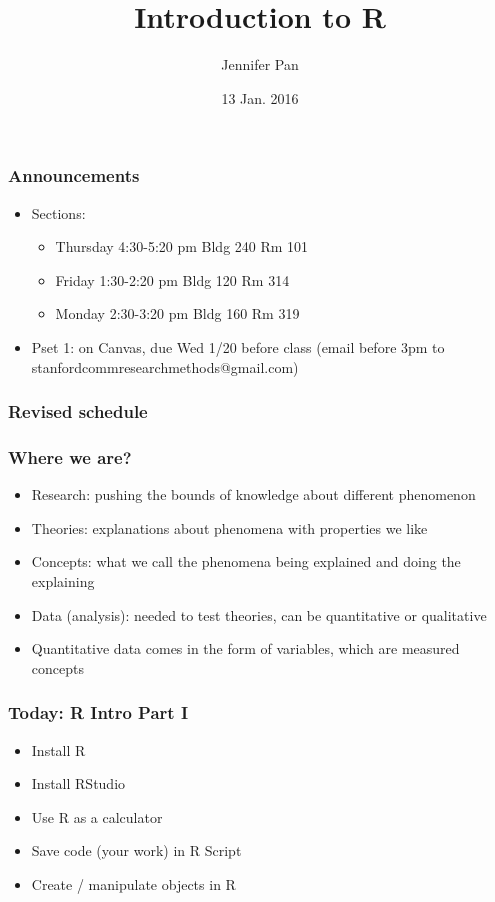 \documentclass{beamer}
\title[COMM 106/206]{Introduction to R}
\subtitle{\black{Communication Research Methods}} %
\author[Jennifer Pan]{Jennifer Pan}
\institute[Stanford]{Assistant Professor\\
  Department of Communication\\
  Stanford University
  \mbox{ }\\
  \mbox{ }\\
  \mbox{ }\\
  \mbox{ }\\
  \mbox{ }\\
  \mbox{ }\\
  \mbox{ }\\
  \mbox{ }\\
  \mbox{ }\\
  {January 13, 2016}}
\date{}
\begin{document}
\frame{\titlepage}
\date{13 Jan. 2016}

\begin{frame}
 \frametitle<+->{Announcements}
 \begin{itemize}[<+->]
   \item Sections: 
     \begin{itemize}
       \item Thursday 4:30-5:20 pm Bldg 240 Rm 101
       \item Friday 1:30-2:20 pm Bldg 120 Rm 314
       \item Monday 2:30-3:20 pm Bldg 160 Rm 319
     \end{itemize}
   \item Pset 1: on Canvas, due Wed 1/20 before class (email before 3pm to stanfordcommresearchmethods@gmail.com)
 \end{itemize}
\end{frame}

\begin{frame}
 \frametitle<+->{Revised schedule}
\end{frame}

\begin{frame}
 \frametitle<+->{Where we are?}
 \pause
 \begin{itemize}[<+->]
   \item Research: pushing the bounds of knowledge about different phenomenon
   \item Theories: explanations about phenomena with properties we like
   \item Concepts: what we call the phenomena being explained and doing the explaining
   \item Data (analysis): needed to test theories, can be quantitative or qualitative
   \item Quantitative data comes in the form of variables, which are measured concepts
 \end{itemize}
   
\end{frame}

\begin{frame}
 \frametitle<+->{Today: R Intro Part I}
 \begin{itemize}[<+->]
   \item Install R
   \item Install RStudio
   \item Use R as a calculator
   \item Save code (your work) in R Script
   \item Create / manipulate \alert{objects} in R
 \end{itemize}
\end{frame}
\end{document}
